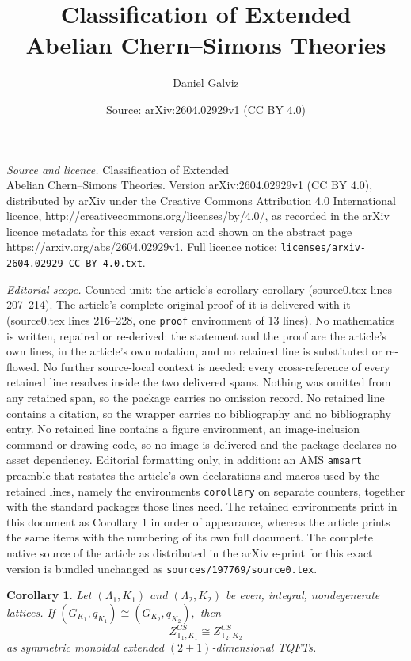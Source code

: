 \documentclass[10pt,a4paper]{amsart}
\title{Classification of Extended\\ Abelian Chern--Simons Theories}
\author{Daniel Galviz}
\date{Source: arXiv:2604.02929v1 (CC BY 4.0)}
\newtheorem{corollary}{Corollary}
\begin{document}
\maketitle

\noindent\emph{Source and licence.} Classification of Extended\\ Abelian Chern--Simons Theories. Version arXiv:2604.02929v1 (CC BY 4.0), distributed by arXiv under the Creative Commons Attribution 4.0 International licence, http://creativecommons.org/licenses/by/4.0/, as recorded in the arXiv licence metadata for this exact version and shown on the abstract page https://arxiv.org/abs/2604.02929v1. Full licence notice: \texttt{licenses/arxiv-2604.02929-CC-BY-4.0.txt}.\par\smallskip

\noindent\textit{Editorial scope.} Counted unit: the article's corollary corollary (source0.tex lines 207--214). The article's complete original proof of it is delivered with it (source0.tex lines 216--228, one \texttt{proof} environment of 13 lines). No mathematics is written, repaired or re-derived: the statement and the proof are the article's own lines, in the article's own notation, and no retained line is substituted or re-flowed.  No further source-local context is needed: every cross-reference of every retained line resolves inside the two delivered spans.  Nothing was omitted from any retained span, so the package carries no omission record.  No retained line contains a citation, so the wrapper carries no bibliography and no bibliography entry.  No retained line contains a figure environment, an image-inclusion command or drawing code, so no image is delivered and the package declares no asset dependency.  Editorial formatting only, in addition: an AMS \texttt{amsart} preamble that restates the article's own declarations and macros used by the retained lines, namely the environments \texttt{corollary} on separate counters, together with the standard packages those lines need.  The retained environments print in this document as Corollary 1 in order of appearance, whereas the article prints the same items with the numbering of its own full document.  The complete native source of the article as distributed in the arXiv e-print for this exact version is bundled unchanged as \texttt{sources/197769/source0.tex}.
\begin{corollary}
Let $(\Lambda_1,K_1)$ and $(\Lambda_2,K_2)$ be even, integral, nondegenerate
lattices. If $(G_{K_1},q_{K_1})\cong (G_{K_2},q_{K_2}),$ then
\[
Z^{CS}_{\mathbb T_1,K_1}\cong Z^{CS}_{\mathbb T_2,K_2}
\]
as symmetric monoidal extended $(2+1)$-dimensional TQFTs.
\end{corollary}
\end{document}
